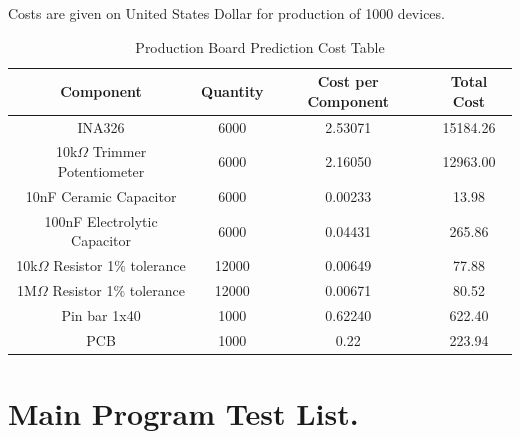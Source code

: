 Costs are given on United States Dollar for production of 1000 devices.\\
\begin{table}[htb]
  \begin{center}
    \ABNTEXreducedfont
    \caption[Production Board Prediction Cost Table]{Production Board Prediction Cost Table}
    \label{Production-cost}
    \begin{tabular}{|c|c|c|c|}
     \hline
    Component & Quantity & Cost per Component & Total Cost \\ \hline
    INA326 & 6000 & 2.53071 & 15184.26\\ \hline
    10k$\Omega$ Trimmer Potentiometer & 6000 & 2.16050 & 12963.00 \\ \hline
    10nF Ceramic Capacitor & 6000 & 0.00233 & 13.98 \\ \hline
    100nF Electrolytic Capacitor & 6000 & 0.04431 & 265.86 \\ \hline
    10k$\Omega$ Resistor 1$\%$ tolerance & 12000 & 0.00649 & 77.88 \\ \hline
    1M$\Omega$ Resistor 1$\%$ tolerance & 12000 & 0.00671 & 80.52 \\ \hline
    Pin bar 1x40 & 1000 & 0.62240 & 622.40 \\ \hline
    PCB & 1000 & 0.22 & 223.94 \\ \hline
  \end{tabular}
\end{center}
\end{table}

\chapter{Main Program Test List.}
\label{test-list}

